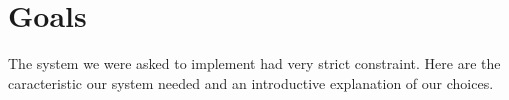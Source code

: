 \newpage\cleardoublepage{}
\section{Goals}
The system we were asked to implement had very strict constraint. Here are the caracteristic our system needed and an introductive explanation of our choices.